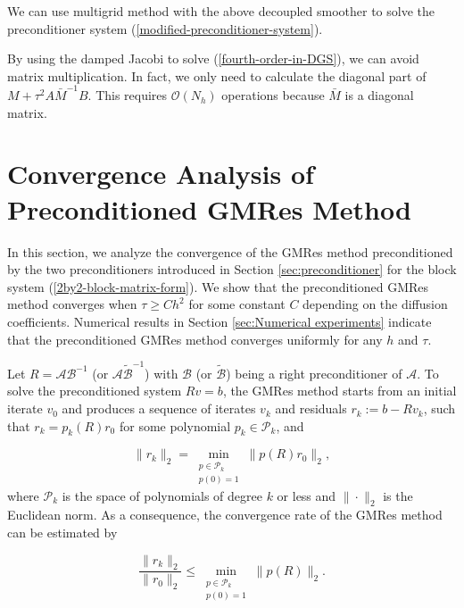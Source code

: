 \documentclass[smallcondensed]{svjour3}
\numberwithin{equation}{section} \numberwithin{table}{section}
\numberwithin{figure}{section}
\numberwithin{algorithm}{section}
\begin{document}
We can use multigrid method with the above decoupled smoother to solve the preconditioner system (\ref{modified-preconditioner-system}).

\begin{remark}
By using the damped Jacobi to solve (\ref{fourth-order-in-DGS}), we can avoid matrix multiplication. In fact, we only need to calculate the diagonal part of $M+\tau^2A\bar{M}^{-1}B$. This requires $\mathcal{O}(N_h)$ operations because $\bar{M}$ is a diagonal matrix.
\end{remark}

\section{Convergence Analysis of Preconditioned GMRes Method}
\label{sec:convergence}
In this section, we analyze the convergence of the GMRes method preconditioned by the two 
preconditioners introduced in Section \ref{sec:preconditioner} for the block system (\ref{2by2-block-matrix-form}). We show that
 the preconditioned GMRes method converges when $\tau\geq Ch^2$ for some constant $C$ depending on the diffusion coefficients. Numerical results in Section \ref{sec:Numerical experiments} indicate that the preconditioned GMRes method converges uniformly for any $h$ and $\tau$.  

Let $R=\mathcal{A}\mathcal{B}^{-1}$ (or $\mathcal{A}\tilde{\mathcal{B}}^{-1}$) with $\mathcal{B}$ (or $\tilde{\mathcal{B}}$) being a right preconditioner of $\mathcal{A}$. To solve the preconditioned system $Rv=b$, the GMRes method starts from an initial iterate $v_0$ and produces a sequence of iterates
$v_k$ and residuals $r_k := b-Rv_k$, such that  $r_k = p_k(R) r_0$ for some polynomial $p_k\in\mathcal{P}_k$, and

\begin{equation}\label{convergrate}
\|r_k\|_2 = \min_{\substack{p\in \mathcal{P}_k\\ p(0)=1}}\|p(R) r_0\|_2,
\end{equation}
where $\mathcal{P}_k$ is the space of polynomials of degree $k$ or less and $\|\cdot\|_2$ is the Euclidean norm. As a consequence, the convergence rate of the GMRes method can be estimated by

\begin{equation}\label{rate4gmres}
\frac{\|r_k\|_2}{\|r_0\|_2}\leq \min_{\substack{p\in \mathcal{P}_k\\ p(0)=1}}\|p(R)\|_2 .
\end{equation}
\end{document}
